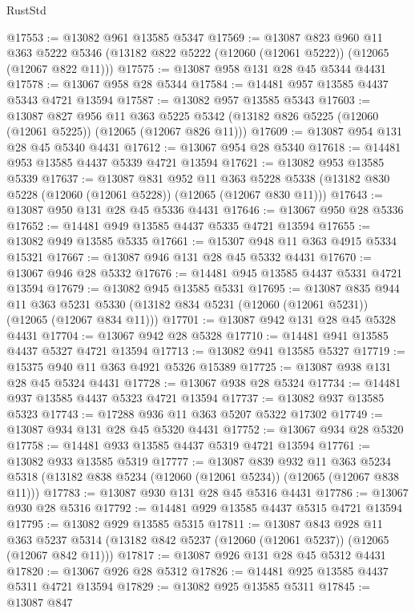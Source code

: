 \begin{lexlean}{RustStd}
\begin{coremodule}
@17553 := @13082 @961 @13585 @5347
@17569 := @13087
    @823
    @960
    @11
    @363
    @5222
    @5346
    (@13182 @822 @5222 (@12060 (@12061 @5222)) (@12065 (@12067 @822 @11)))
@17575 := @13087 @958 @131 @28 @45 @5344 @4431
@17578 := @13067 @958 @28 @5344
@17584 := @14481 @957 @13585 @4437 @5343 @4721 @13594
@17587 := @13082 @957 @13585 @5343
@17603 := @13087
    @827
    @956
    @11
    @363
    @5225
    @5342
    (@13182 @826 @5225 (@12060 (@12061 @5225)) (@12065 (@12067 @826 @11)))
@17609 := @13087 @954 @131 @28 @45 @5340 @4431
@17612 := @13067 @954 @28 @5340
@17618 := @14481 @953 @13585 @4437 @5339 @4721 @13594
@17621 := @13082 @953 @13585 @5339
@17637 := @13087
    @831
    @952
    @11
    @363
    @5228
    @5338
    (@13182 @830 @5228 (@12060 (@12061 @5228)) (@12065 (@12067 @830 @11)))
@17643 := @13087 @950 @131 @28 @45 @5336 @4431
@17646 := @13067 @950 @28 @5336
@17652 := @14481 @949 @13585 @4437 @5335 @4721 @13594
@17655 := @13082 @949 @13585 @5335
@17661 := @15307 @948 @11 @363 @4915 @5334 @15321
@17667 := @13087 @946 @131 @28 @45 @5332 @4431
@17670 := @13067 @946 @28 @5332
@17676 := @14481 @945 @13585 @4437 @5331 @4721 @13594
@17679 := @13082 @945 @13585 @5331
@17695 := @13087
    @835
    @944
    @11
    @363
    @5231
    @5330
    (@13182 @834 @5231 (@12060 (@12061 @5231)) (@12065 (@12067 @834 @11)))
@17701 := @13087 @942 @131 @28 @45 @5328 @4431
@17704 := @13067 @942 @28 @5328
@17710 := @14481 @941 @13585 @4437 @5327 @4721 @13594
@17713 := @13082 @941 @13585 @5327
@17719 := @15375 @940 @11 @363 @4921 @5326 @15389
@17725 := @13087 @938 @131 @28 @45 @5324 @4431
@17728 := @13067 @938 @28 @5324
@17734 := @14481 @937 @13585 @4437 @5323 @4721 @13594
@17737 := @13082 @937 @13585 @5323
@17743 := @17288 @936 @11 @363 @5207 @5322 @17302
@17749 := @13087 @934 @131 @28 @45 @5320 @4431
@17752 := @13067 @934 @28 @5320
@17758 := @14481 @933 @13585 @4437 @5319 @4721 @13594
@17761 := @13082 @933 @13585 @5319
@17777 := @13087
    @839
    @932
    @11
    @363
    @5234
    @5318
    (@13182 @838 @5234 (@12060 (@12061 @5234)) (@12065 (@12067 @838 @11)))
@17783 := @13087 @930 @131 @28 @45 @5316 @4431
@17786 := @13067 @930 @28 @5316
@17792 := @14481 @929 @13585 @4437 @5315 @4721 @13594
@17795 := @13082 @929 @13585 @5315
@17811 := @13087
    @843
    @928
    @11
    @363
    @5237
    @5314
    (@13182 @842 @5237 (@12060 (@12061 @5237)) (@12065 (@12067 @842 @11)))
@17817 := @13087 @926 @131 @28 @45 @5312 @4431
@17820 := @13067 @926 @28 @5312
@17826 := @14481 @925 @13585 @4437 @5311 @4721 @13594
@17829 := @13082 @925 @13585 @5311
@17845 := @13087
    @847

\end{coremodule}
\end{lexlean}

